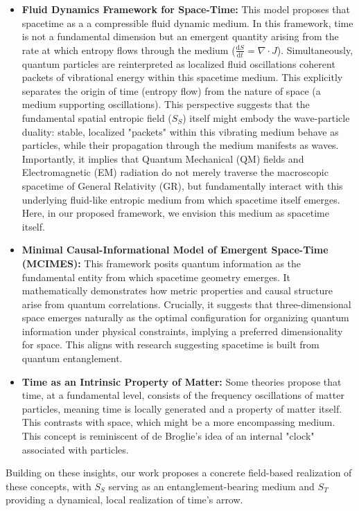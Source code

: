 \documentclass[11pt,a4paper]{article} %
\newcommand{\ST}{S_T}
\newcommand{\SSp}{S_S} %
\begin{document}
\begin{itemize}
    \item \textbf{Fluid Dynamics Framework for Space-Time:} This model proposes that spacetime as a a compressible fluid dynamic medium.\cite{padmanabhan2005gravity} In this framework, time is not a fundamental dimension but an emergent quantity arising from the rate at which entropy flows through the medium ($\frac{\text{d}S}{\text{d}t}=\nabla\cdot J$). Simultaneously, quantum particles are reinterpreted as localized fluid oscillations coherent packets of vibrational energy within this spacetime medium. This explicitly separates the origin of time (entropy flow) from the nature of space (a medium supporting oscillations). This perspective suggests that the fundamental spatial entropic field ($\SSp$) itself might embody the wave-particle duality: stable, localized "packets" within this vibrating medium behave as particles, while their propagation through the medium manifests as waves. Importantly, it implies that Quantum Mechanical (QM) fields and Electromagnetic (EM) radiation do not merely traverse the macroscopic spacetime of General Relativity (GR), but fundamentally interact with this underlying fluid-like entropic medium from which spacetime itself emerges. Here, in our proposed framework, we envision this medium as spacetime itself.
    \item \textbf{Minimal Causal-Informational Model of Emergent Space-Time (MCIMES):} This framework posits quantum information as the fundamental entity from which spacetime geometry emerges.\cite{vanraamsdonk2010building,swingle2018spacetime} It mathematically demonstrates how metric properties and causal structure arise from quantum correlations. Crucially, it suggests that three-dimensional space emerges naturally as the optimal configuration for organizing quantum information under physical constraints, implying a preferred dimensionality for space. This aligns with research suggesting spacetime is built from quantum entanglement.
    \item \textbf{Time as an Intrinsic Property of Matter:} Some theories propose that time, at a fundamental level, consists of the frequency oscillations of matter particles, meaning time is locally generated and a property of matter itself. This contrasts with space, which might be a more encompassing medium. This concept is reminiscent of de Broglie's idea of an internal "clock" associated with particles.\cite{debroglie1925recherches,altaie2022time}
\end{itemize}
Building on these insights, our work proposes a concrete field-based realization of these concepts, with $\SSp$ serving as an entanglement-bearing medium and $\ST$ providing a dynamical, local realization of time's arrow.
\end{document}
